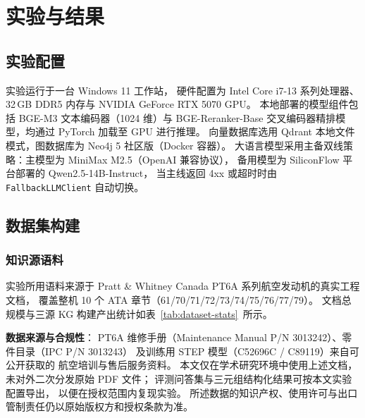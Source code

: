 \section{实验与结果}
\label{sec:experiment}

\subsection{实验配置}
\label{sec:exp-setup}

实验运行于一台 Windows 11 工作站，
硬件配置为 Intel Core i7-13 系列处理器、32\,GB DDR5 内存与
NVIDIA GeForce RTX 5070 GPU。
本地部署的模型组件包括 BGE-M3 文本编码器（1024 维）与
BGE-Reranker-Base 交叉编码器精排模型，均通过 PyTorch 加载至 GPU 进行推理。
向量数据库选用 Qdrant 本地文件模式，图数据库为 Neo4j 5 社区版（Docker 容器）。
大语言模型采用主备双线策略：主模型为 MiniMax M2.5（OpenAI 兼容协议），
备用模型为 SiliconFlow 平台部署的 Qwen2.5-14B-Instruct，
当主线返回 4xx 或超时时由 \texttt{FallbackLLMClient} 自动切换。

\subsection{数据集构建}
\label{sec:exp-dataset}

\subsubsection{知识源语料}

实验所用语料来源于 Pratt \& Whitney Canada PT6A 系列航空发动机的真实工程文档，
覆盖整机 10 个 ATA 章节（61/70/71/72/73/74/75/76/77/79）。
文档总规模与三源 KG 构建产出统计如表~\ref{tab:dataset-stats}~所示。

\textbf{数据来源与合规性}：
PT6A 维修手册（Maintenance Manual P/N 3013242）、零件目录（IPC P/N 3013243）
及训练用 STEP 模型（C52696C / C89119）来自可公开获取的
航空培训与售后服务资料。
本文仅在学术研究环境中使用上述文档，未对外二次分发原始 PDF 文件；
评测问答集与三元组结构化结果可按本文实验配置导出，
以便在授权范围内复现实验。
所述数据的知识产权、使用许可与出口管制责任仍以原始版权方和授权条款为准。

